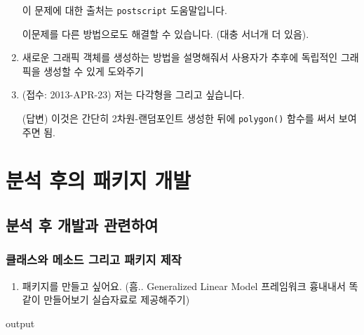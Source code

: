 \documentclass{book}
\begin{document}
\begin{enumerate}
이 문제에 대한 출처는 \texttt{postscript} 도움말입니다.

이문제를 다른 방법으로도 해결할 수 있습니다.  (대충 서너개 더 있음).

\item 새로운 그래픽 객체를 생성하는 방법을 설명해줘서 사용자가 추후에 독립적인 그래픽을 생성할 수 있게 도와주기 


	\item (접수: 2013-APR-23)  저는 다각형을 그리고 싶습니다. 
	
	\textsf{(답변)}  이것은 간단히 2차원-랜덤포인트 생성한 뒤에 \texttt{polygon()} 함수를 써서 보여주면 됨. 

\end{enumerate}





%
%

\part{분석 후의 패키지 개발}

\chapter{분석 후 개발과 관련하여}
\section{클래스와 메소드 그리고 패키지 제작}
\begin{enumerate}
\item 패키지를 만들고 싶어요. (흠.. Generalized Linear Model 프레임워크 흉내내서 똑같이 만들어보기 실습자료로 제공해주기)
\end{enumerate}
\begin{Schunk}
\begin{Soutput}
output
\end{Soutput}
\end{Schunk}



%
%


%
%
%
\end{document}
